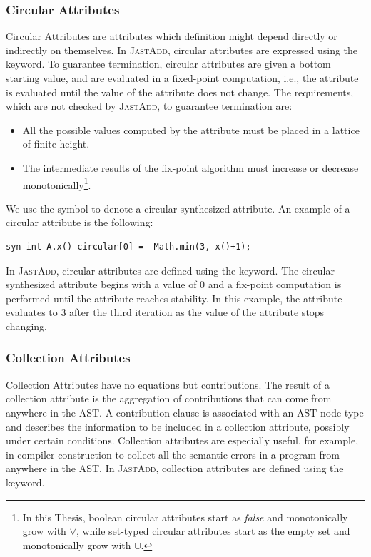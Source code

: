    \subsubsection*{Circular Attributes} Circular Attributes are attributes which definition might depend directly
    or indirectly on themselves. In \textsc{JastAdd}, circular attributes are expressed using the 
    keyword. To guarantee termination, circular attributes are given a bottom starting value, and are evaluated in a fixed-point
    computation, i.e., the attribute is evaluated until the value of the attribute does not change.
    The requirements, which are not checked by \textsc{JastAdd}, to guarantee termination are:
    \begin{itemize}
        \item All the possible values computed by the attribute must be placed
        in a lattice of finite height.
        \item The intermediate results of the fix-point algorithm must increase
        or decrease monotonically\footnote{In this Thesis, boolean circular attributes start
        as \emph{false} and monotonically grow with $\vee$, while set-typed circular attributes
        start as the empty set and monotonically grow with $\cup$.}.
    \end{itemize}
    We use the symbol  to denote a circular synthesized attribute.
    An example of a circular attribute is the following:
    \begin{lstlisting}[language=JastAdd]
syn int A.x() circular[0] =  Math.min(3, x()+1);
\end{lstlisting}
In \textsc{JastAdd}, circular attributes are defined using the  keyword.
The circular synthesized attribute  begins with a value of 0 and
a fix-point computation is performed until the attribute reaches stability.
In this example, the attribute evaluates to 3 after the third iteration as
the value of the attribute stops changing.


    \subsubsection*{Collection Attributes} Collection Attributes have no equations but contributions. The
    result of a collection attribute is the aggregation of contributions that can
    come from anywhere in the AST. A contribution clause is associated with
    an AST node type and describes the information to be included in a collection
    attribute, possibly under certain conditions. Collection attributes are especially
    useful, for example, in compiler construction to collect all the semantic errors in a program
    from anywhere in the AST. In \textsc{JastAdd}, collection attributes are defined using the
     keyword.

